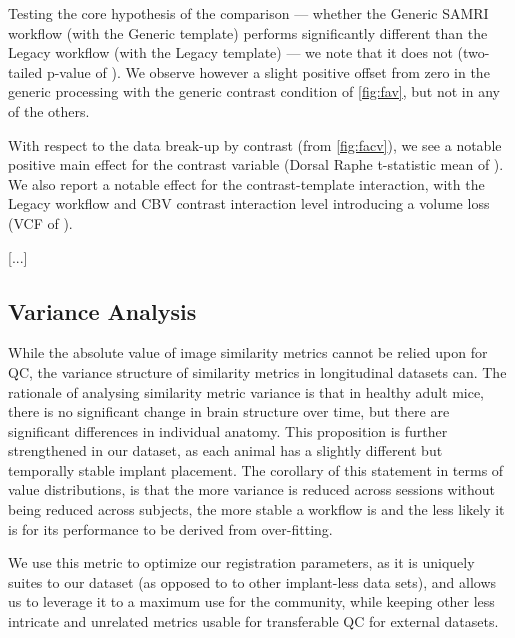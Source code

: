 Testing the core hypothesis of the comparison ---
whether the Generic SAMRI workflow (with the Generic template) performs significantly different than the Legacy workflow (with the Legacy template) ---
we note that it does not
(two-tailed p-value of
).
We observe however a slight positive offset from zero in the generic processing with the generic contrast condition of \cref{fig:fav}, but not in any of the others.

With respect to the data break-up by contrast (from \cref{fig:facv}), we see a notable positive main effect for the contrast variable
(Dorsal Raphe t-statistic mean of
).
We also report a notable effect for the contrast-template interaction, with the Legacy workflow and CBV contrast interaction level introducing a volume loss
(VCF of
).


\begin{center}
        \textcolor{lg}{[...]}
\end{center}

\subsection{Variance Analysis}

While the absolute value of image similarity metrics cannot be relied upon for QC, the variance structure of similarity metrics in longitudinal datasets can.
The rationale of analysing similarity metric variance is that in healthy adult mice, there is no significant change in brain structure over time, but there are significant differences in individual anatomy.
This proposition is further strengthened in our dataset, as each animal has a slightly different but temporally stable implant placement. 
The corollary of this statement in terms of value distributions, is that the more variance is reduced across sessions without being reduced across subjects, the more stable a workflow is and the less likely it is for its performance to be derived from over-fitting.


\color{lg}
We use this metric to optimize our registration parameters, as it is uniquely suites to our dataset (as opposed to to other implant-less data sets), and allows us to leverage it to a maximum use for the community, while keeping other less intricate and unrelated metrics usable for transferable QC for external datasets.


